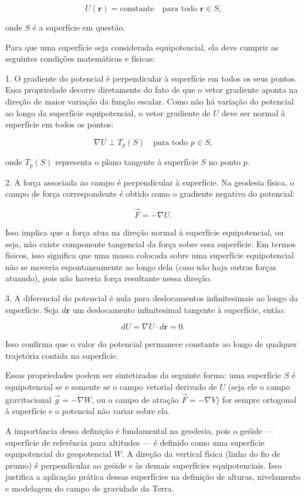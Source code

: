 \[
U(\mathbf{r}) = \text{constante} \quad \text{para todo } \mathbf{r} \in S \text{,}
\]

onde \( S \) é a superfície em questão.

Para que uma superfície seja considerada equipotencial, ela deve cumprir as seguintes condições matemáticas e físicas:

1. O gradiente do potencial é perpendicular à superfície em todos os seus pontos.  
   Essa propriedade decorre diretamente do fato de que o vetor gradiente aponta na direção de maior variação da função escalar. Como não há variação do potencial ao longo da superfície equipotencial, o vetor gradiente de \( U \) deve ser normal à superfície em todos os pontos:

   \[
   \nabla U \perp T_p(S) \quad \text{para todo } p \in S \text{,}
   \]

   onde \( T_p(S) \) representa o plano tangente à superfície \( S \) no ponto \( p \).

2. A força associada ao campo é perpendicular à superfície. 
   Na geodesia física, o campo de força correspondente é obtido como o gradiente negativo do potencial:

   \[
   \vec{F} = -\nabla U \text{.}
   \]

   Isso implica que a força atua na direção normal à superfície equipotencial, ou seja, não existe componente tangencial da força sobre essa superfície. Em termos físicos, isso significa que uma massa colocada sobre uma superfície equipotencial não se moveria espontaneamente ao longo dela (caso não haja outras forças atuando), pois não haveria força resultante nessa direção.

3. A diferencial do potencial é nula para deslocamentos infinitesimais ao longo da superfície.  
   Seja \( d\mathbf{r} \) um deslocamento infinitesimal tangente à superfície, então:

   \[
   dU = \nabla U \cdot d\mathbf{r} = 0 \text{.}
   \]

   Isso confirma que o valor do potencial permanece constante ao longo de qualquer trajetória contida na superfície.

Essas propriedades podem ser sintetizadas da seguinte forma: uma superfície \( S \) é equipotencial se e somente se o campo vetorial derivado de \( U \) (seja ele o campo gravitacional \( \vec{g} = -\nabla W \), ou o campo de atração \( \vec{F} = -\nabla V \)) for sempre ortogonal à superfície e o potencial não variar sobre ela.

A importância dessa definição é fundamental na geodesia, pois o geóide — superfície de referência para altitudes — é definido como uma superfície equipotencial do geopotencial \( W \). A direção da vertical física (linha do fio de prumo) é perpendicular ao geóide e às demais superfícies equipotenciais. Isso justifica a aplicação prática dessas superfícies na definição de alturas, nivelamento e modelagem do campo de gravidade da Terra.

